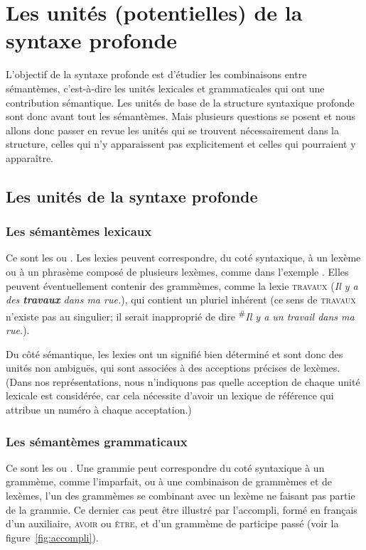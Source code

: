 \section{Les unités (potentielles) de la syntaxe profonde}
\label{sec:13-unites}
L’objectif de la syntaxe profonde est d’étudier les combinaisons entre sémantèmes, c’est-à-dire les unités lexicales et grammaticales qui ont une contribution sémantique. Les unités de base de la structure syntaxique profonde sont donc avant tout les sémantèmes. Mais plusieurs questions se posent et nous allons donc passer en revue les unités qui se trouvent nécessairement dans la structure, celles qui n’y apparaissent pas explicitement et celles qui pourraient y apparaître.

\subsection{Les unités de la syntaxe profonde}

\subsubsection{Les sémantèmes lexicaux} 
Ce sont les  ou . Les lexies peuvent correspondre, du coté syntaxique, à un lexème ou à un phrasème composé de plusieurs lexèmes, comme  dans l’exemple . Elles peuvent éventuellement contenir des grammèmes, comme la lexie \textsc{travaux} (\textit{Il y a des \textbf{travaux} dans ma rue.}), qui contient un pluriel inhérent (ce sens de \textsc{travaux} n'existe pas au singulier; il serait inapproprié de dire \textsuperscript{\#}\textit{Il y a un travail dans ma rue.}).

\begin{sloppypar}
Du côté sémantique, les lexies ont un signifié bien déterminé et sont donc des unités non ambiguës, qui sont associées à des acceptions précises de lexèmes. (Dans nos représentations, nous n’indiquons pas quelle acception de chaque unité lexicale est considérée, car cela nécessite d’avoir un lexique de référence qui attribue un numéro à chaque acceptation.)
\end{sloppypar}

\subsubsection{Les sémantèmes grammaticaux} 
\begin{sloppypar}
Ce sont les  ou . Une grammie peut correspondre du coté syntaxique à un grammème, comme l’imparfait, ou à une combinaison de grammèmes et de lexèmes, l’un des grammèmes se combinant avec un lexème ne faisant pas partie de la grammie. Ce dernier cas peut être illustré par l’accompli, formé en français d’un auxiliaire, \textsc{avoir} ou \textsc{être}, et d’un grammème de participe passé (voir la figure~\ref{fig:accompli}).
\end{sloppypar}

